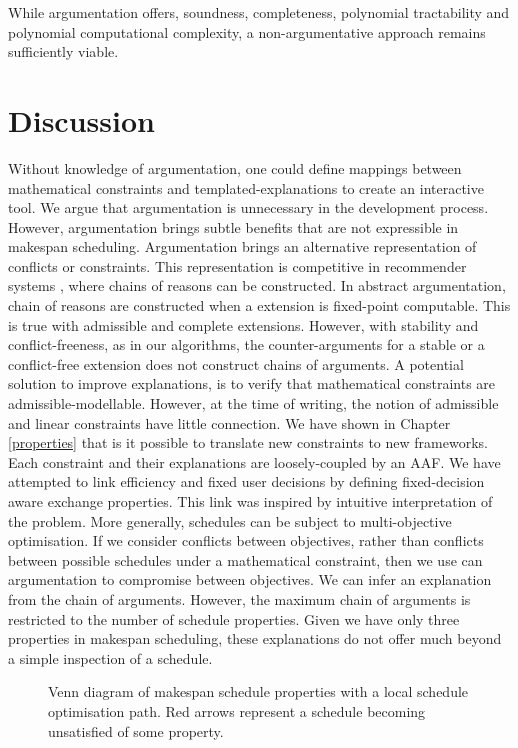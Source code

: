 While argumentation offers, soundness, completeness, polynomial tractability and polynomial computational complexity, a non-argumentative approach remains sufficiently viable.

\section{Discussion}

Without knowledge of argumentation, one could define mappings between mathematical constraints and templated-explanations to create an interactive tool. We argue that argumentation is unnecessary in the development process. However, argumentation brings subtle benefits that are not expressible in makespan scheduling.
\linespace
Argumentation brings an alternative representation of conflicts or constraints. This representation is competitive in recommender systems \cite{recommend}, where chains of reasons can be constructed. In abstract argumentation, chain of reasons are constructed when a extension is fixed-point computable. This is true with admissible and complete extensions. However, with stability and conflict-freeness, as in our algorithms, the counter-arguments for a stable or a conflict-free extension does not construct chains of arguments. A potential solution to improve explanations, is to verify that mathematical constraints are admissible-modellable. However, at the time of writing, the notion of admissible and linear constraints have little connection. 
\linespace
We have shown in Chapter \ref{properties} that is it possible to translate new constraints to new frameworks. Each constraint and their explanations are loosely-coupled by an AAF. We have attempted to link efficiency and fixed user decisions by defining fixed-decision aware exchange properties. This link was inspired by intuitive interpretation of the problem. More generally, schedules can be subject to multi-objective optimisation. If we consider conflicts between objectives, rather than conflicts between possible schedules under a mathematical constraint, then we use can argumentation to compromise between objectives. We can infer an explanation from the chain of arguments. However, the maximum chain of arguments is restricted to the number of schedule properties. Given we have only three properties in makespan scheduling, these explanations do not offer much beyond a simple inspection of a schedule.

\begin{figure}[H]
	\label{problempath}
	
	\caption{Venn diagram of makespan schedule properties with a local schedule optimisation path. Red arrows represent a schedule becoming unsatisfied of some property.}
\end{figure}

